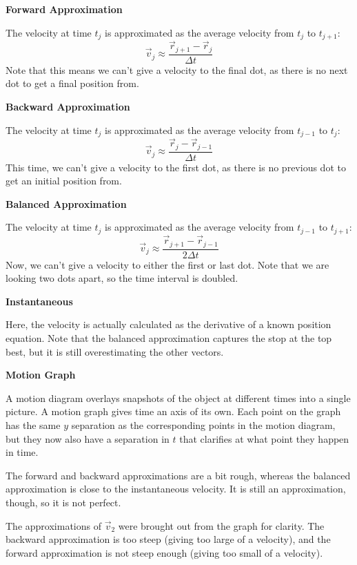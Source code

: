 \documentclass[]{article}
\begin{document}
\begin{TeacherMargin}
\noindent\textbf{Forward Approximation}

The velocity at time $t_{j}$ is approximated as the average velocity from $t_{j}$ to $t_{j+1}$:
\[
\vec{v}_{j} \approx \frac{\vec{r}_{j+1}-\vec{r}_{j}}{\Delta t}
\]
Note that this means we can't give a velocity to the final dot, as there is no next dot to get a final position from.

\noindent\textbf{Backward Approximation}

The velocity at time $t_{j}$ is approximated as the average velocity from $t_{j-1}$ to $t_{j}$:
\[
\vec{v}_{j} \approx \frac{\vec{r}_{j}-\vec{r}_{j-1}}{\Delta t}
\]
This time, we can't give a velocity to the first dot, as there is no previous dot to get an initial position from.

\noindent\textbf{Balanced Approximation}

The velocity at time $t_{j}$ is approximated as the average velocity from $t_{j-1}$ to $t_{j+1}$:
\[
\vec{v}_{j} \approx \frac{\vec{r}_{j+1}-\vec{r}_{j-1}}{2\Delta t}
\]
Now, we can't give a velocity to either the first or last dot. Note that we are looking two dots apart, so the time interval is doubled.

\noindent\textbf{Instantaneous}

Here, the velocity is actually calculated as the derivative of a known position equation. Note that the balanced approximation captures the stop at the top best, but it is still overestimating the other vectors.

\noindent\textbf{Motion Graph}

A motion diagram overlays snapshots of the object at different times into a single picture. A motion graph gives time an axis of its own. Each point on the graph has the same $y$ separation as the corresponding points in the motion diagram, but they now also have a separation in $t$ that clarifies at what point they happen in time.

The forward and backward approximations are a bit rough, whereas the balanced approximation is close to the instantaneous velocity. It is still an approximation, though, so it is not perfect.

The approximations of $\vec{v}_{2}$ were brought out from the graph for clarity. The backward approximation is too steep (giving too large of a velocity), and the forward approximation is not steep enough (giving too small of a velocity).

\end{TeacherMargin}
\end{document}
